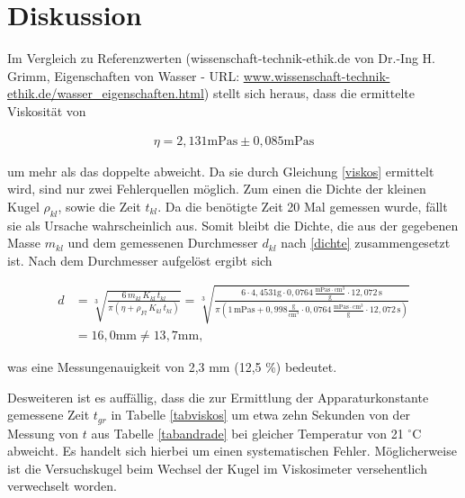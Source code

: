 \section{Diskussion}
Im Vergleich zu Referenzwerten ({wissenschaft-technik-ethik.de von Dr.-Ing H. Grimm, Eigenschaften von Wasser - URL: \href{http://www.wissenschaft-technik-ethik.de/wasser_eigenschaften.html#kap06}{www.wissenschaft-technik-ethik.de/wasser\_eigenschaften.html}})
stellt sich heraus, dass die ermittelte Viskosität von 

\begin{align*}
 \eta = 2,131 \text{mPas} \pm 0,085 \text{mPas}
\end{align*}

um mehr als das doppelte abweicht. Da sie durch Gleichung \eqref{viskos} ermittelt wird, sind nur zwei Fehlerquellen möglich. Zum einen
die Dichte der kleinen Kugel $\rho_{kl}$, sowie die Zeit $t_{kl}$. Da die benötigte Zeit 20 Mal gemessen wurde, fällt sie als Ursache
wahrscheinlich aus. Somit bleibt die Dichte, die aus der gegebenen Masse $m_{kl}$ und dem gemessenen Durchmesser $d_{kl}$ nach \eqref{dichte}
zusammengesetzt ist. Nach dem Durchmesser aufgelöst ergibt sich

\begin{align}
  \nonumber
  d &= \sqrt[3]{\frac{6\, m_{kl} \, K_{kl} \, t_{kl} }{\pi \left(\eta + \rho_{Fl} \, K_{kl} \, t_{kl}\right)}} = \sqrt[3]{\frac{6\cdot 4,4531 \text{g} \cdot 0,0764 \,\frac{\text{mPas}\cdot \text{cm}^3}{\text{g}} \cdot 12,072 \,\text{s} }{\pi \left(1\,\text{mPas} + 0,998  \frac{\text{g}}{\text{cm}^3} \cdot 0,0764 \,\frac{\text{mPas}\cdot \text{cm}^3}{\text{g}} \cdot 12,072 \,\text{s}\right)}}\\
  &= 16,0 \text{mm} \neq 13,7 \text{mm},
\end{align}

was eine Messungenauigkeit von 2,3 mm (12,5 \%) bedeutet.

Desweiteren ist es auffällig, dass die zur Ermittlung der Apparaturkonstante gemessene Zeit $t_{gr}$ in Tabelle \ref{tabviskos} um etwa zehn 
Sekunden von der Messung von $t$ aus Tabelle \ref{tabandrade} bei gleicher Temperatur von 21 $^\circ$C abweicht. 
Es handelt sich hierbei um einen systematischen Fehler. Möglicherweise ist die Versuchskugel beim Wechsel der Kugel im Viskosimeter 
versehentlich verwechselt worden.






